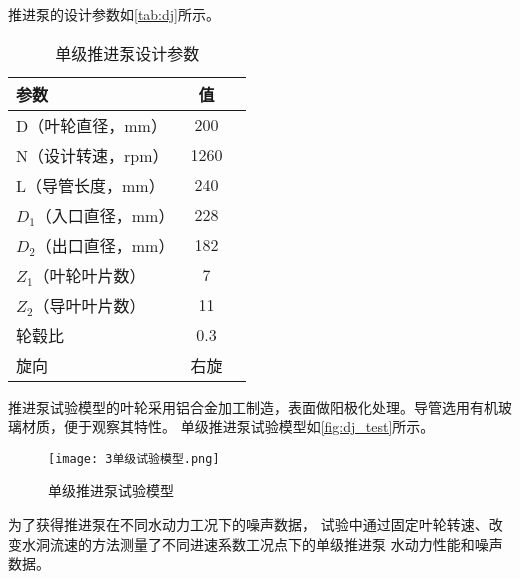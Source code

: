 推进泵的设计参数如\autoref{tab:dj}所示。
\begin{table}[htbp]
    \centering
    \caption{\label{tab:dj}单级推进泵设计参数}
    \begin{tabular}{lcc}
     \toprule
     参数&值\\
     \midrule
     D（叶轮直径，mm）&200\\
     N（设计转速，rpm）&1260\\
     L（导管长度，mm）&240\\
     $D_1$（入口直径，mm）&228\\
     $D_2$（出口直径，mm）&182\\
     $Z_1$（叶轮叶片数）&7\\
     $Z_2$（导叶叶片数）&11\\
     轮毂比&0.3\\
     旋向&右旋\\
     \bottomrule
    \end{tabular}
\end{table}
推进泵试验模型的叶轮采用铝合金加工制造，表面做阳极化处理。导管选用有机玻璃材质，便于观察其特性。
单级推进泵试验模型如\autoref{fig:dj_test}所示。
\begin{figure}[htbp]
    \centering
    \texttt{[image: 3单级试验模型.png]}
    \caption{\label{fig:dj_test}单级推进泵试验模型}
\end{figure}
为了获得推进泵在不同水动力工况下的噪声数据，
试验中通过固定叶轮转速、改变水洞流速的方法测量了不同进速系数工况点下的单级推进泵
水动力性能和噪声数据。

